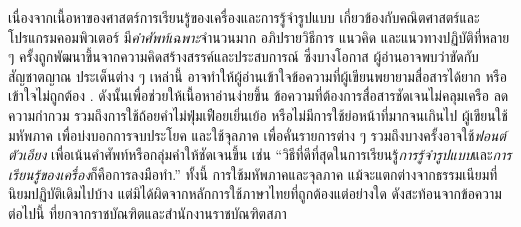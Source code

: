 		เนื่องจากเนื้อหาของศาสตร์การเรียนรู้ของเครื่องและการรู้จำรูปแบบ เกี่ยวข้องกับคณิตศาสตร์และโปรแกรมคอมพิวเตอร์ มี\textit{คำศัพท์เฉพาะ}จำนวนมาก 
		อภิปรายวิธีการ แนวคิด และแนวทางปฏิบัติที่หลาย ๆ ครั้งถูกพัฒนาขึ้นจากความคิดสร้างสรรค์และประสบการณ์ ซึ่งบางโอกาส ผู้อ่านอาจพบว่าขัดกับสัญชาตญาณ
		ประเด็นต่าง ๆ เหล่านี้ อาจทำให้ผู้อ่านเข้าใจข้อความที่ผู้เขียนพยายามสื่อสารได้ยาก หรือเข้าใจไม่ถูกต้อง%
.
		ดังนั้นเพื่อช่วยให้เนื้อหาอ่านง่ายขึ้น ข้อความที่ต้องการสื่อสารชัดเจนไม่คลุมเครือ ลดความกำกวม
		รวมถึงการใช้ถ้อยคำไม่ฟุ่มเฟือยเยิ่นเย้อ หรือไม่มีการใช้ย่อหน้าที่มากจนเกินไป 
		ผู้เขียนใช้{มหัพภาค} เพื่อบ่งบอกการจบประโยค 
		และใช้{จุลภาค} เพื่อคั่นรายการต่าง ๆ
		รวมถึงบางครั้งอาจใช้\textit{ฟอนต์ตัวเอียง}
		เพื่อเน้นคำศัพท์หรือกลุ่มคำให้ชัดเจนขึ้น
		เช่น 
		``วิธีที่ดีที่สุดในการเรียนรู้\textit{การรู้จำรูปแบบ}และ\textit{การเรียนรู้ของเครื่อง}ก็คือการลงมือทำ.''
		ทั้งนี้ การใช้{มหัพภาค}และ{จุลภาค} แม้จะแตกต่างจากธรรมเนียมที่นิยมปฏิบัติเดิมไปบ้าง
		แต่มิได้ผิดจากหลักการใช้ภาษาไทยที่ถูกต้องแต่อย่างใด ดังสะท้อนจากข้อความต่อไปนี้ ที่ยกจากราชบัณฑิตและสำนักงานราชบัณฑิตสภา
		

